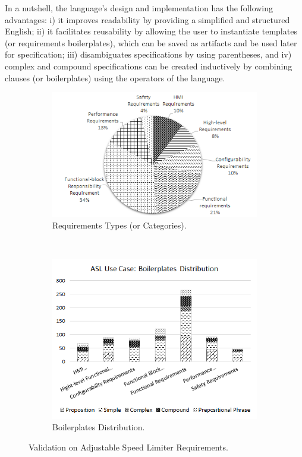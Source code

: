 In a nutshell, the language's design and implementation has the following advantages: i) it improves readability by providing a simplified and structured English; ii) it facilitates reusability by allowing the user to instantiate templates (or requirements boilerplates), which can be saved as artifacts and be used later for specification; iii) disambiguates specifications by using parentheses, and iv) complex and compound specifications can be created inductively by combining clauses (or boilerplates) using the operators of the language.
\begin{figure}
    \centering
    \begin{subfigure}[b]{0.475  \textwidth}
        \includegraphics[width=\textwidth]{pics/aslreq.png}
        \caption{Requirements Types (or Categories).}
        \label{fig_req}
    \end{subfigure}
    ~
        \begin{subfigure}[b]{0.475\textwidth}
        \includegraphics[width=\textwidth]{pics/aslbp.png}
        \caption{Boilerplates Distribution.}
        \label{fig_bpl}
    \end{subfigure}
    \caption{Validation on Adjustable Speed Limiter Requirements.}
    \label{fig_util_power}
\end{figure}

